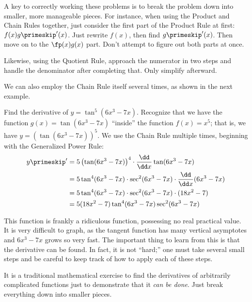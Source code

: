 A key to correctly working these problems is to break the problem down into smaller, more manageable pieces. For instance, when using the Product and Chain Rules together, just consider the first part of the Product Rule at first: $f(x)g\primeskip'(x)$. Just rewrite $f(x)$, then find $g\primeskip'(x)$. Then move on to the $\fp(x)g(x)$ part. Don't attempt to figure out both parts at once.

Likewise, using the Quotient Rule, approach the numerator in two steps and handle the denominator after completing that. Only simplify afterward.

We can also employ the Chain Rule itself several times, as shown in the next example.

\begin{example}\label{ex_chain6}%
Find the derivative of $y = \tan^5(6x^3-7x)$.
\solution
Recognize that we have the function $g(x)=\tan(6x^3-7x)$ ``inside'' the function $f(x) = x^5$; that is, we have $y=\left(\tan(6x^3-7x)\right)^5$. We use the Chain Rule multiple times, beginning with the Generalized Power Rule:
\begin{align*}
y\primeskip' &= 5\left(\tan(6x^3-7x)\right)^4 \cdot \frac{\dd}{\dd x} \tan(6x^3-7x)\\
&= 5\tan^4(6x^3-7x) \cdot \sec^2 (6x^3-7x) \cdot \frac{\dd}{\dd x}(6x^3-7x) \\
&= 5\tan^4 (6x^3-7x) \cdot \sec^2 (6x^3-7x) \cdot (18x^2-7)\\
&= 5(18x^2-7)\tan^4 (6x^3-7x) \sec^2 (6x^3-7x) \\
\end{align*}

This function is frankly a ridiculous function, possessing no real practical value. It is very difficult to graph, as the tangent function has many vertical asymptotes and $6x^3-7x$ grows so very fast. The important thing to learn from this is that the derivative can be found. In fact, it is not ``hard;'' one must take several small steps and be careful to keep track of how to apply each of these steps.%
\end{example}

It is a traditional mathematical exercise to find the derivatives of arbitrarily complicated functions just to demonstrate that it \emph{can be done}. Just break everything down into smaller pieces.

